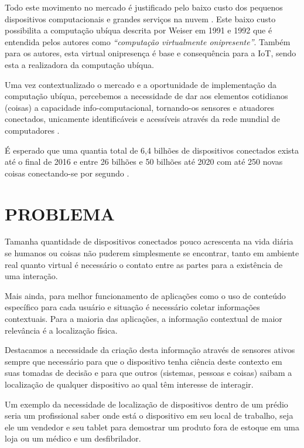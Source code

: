 \documentclass[
	12pt,				%
	openright,			%
	oneside,			%
	a4paper,			%
	chapter=TITLE,		%
	english,			%
	french,				%
	spanish,			%
	brazil				%
	]{abntex2}
\begin{document}
{Todo este movimento no mercado é justificado pelo baixo custo dos pequenos
dispositivos computacionais \cite{RpiZeroLaunch} \cite{Esp8266.net} e grandes
serviços na nuvem \cite{Kaufmann2015} \cite{Amazon2016}. Este baixo custo
possibilita a computação ubíqua descrita por Weiser em 1991 e 1992
\cite{Weiser1999} que é entendida pelos autores como \textit{``computação
virtualmente onipresente''}. Também para os autores, esta virtual onipresença é
base e consequência para a IoT, sendo esta a realizadora da computação ubíqua.

Uma vez contextualizado o mercado e a oportunidade de implementação da
computação ubíqua, percebemos a necessidade de dar aos elementos cotidianos
(coisas) a capacidade info-computacional, tornando-os sensores e atuadores
conectados, unicamente identificáveis e acessíveis através da rede mundial
de computadores \cite{Lemos2013} \cite{Kranenburg2012}.

É esperado que uma quantia total de 6,4 bilhões de dispositivos conectados
exista até o final de 2016 \cite{GARTNER2015} e entre 26 bilhões
\cite{GARTNER2014} e 50 bilhões até 2020 com até 250 novas coisas conectando-se
por segundo \cite{CiscoBlog2013}.

\chapter{PROBLEMA}
\label{chap:PROBLEMA}

Tamanha quantidade de dispositivos conectados pouco acrescenta na vida diária se
humanos ou coisas não puderem simplesmente se encontrar, tanto em ambiente real
quanto virtual é necessário o contato entre as partes para a existência de uma
interação.

Mais ainda, para melhor funcionamento de aplicações como o uso de conteúdo
específico para cada usuário e situação é necessário coletar informações
contextuais. Para a maioria das aplicações, a informação contextual de maior
relevância é a localização física.

Destacamos a necessidade da criação desta informação através de sensores ativos
sempre que necessário para que o dispositivo tenha ciência deste contexto em
suas tomadas de decisão e para que outros (sistemas, pessoas e coisas) saibam a
localização de qualquer dispositivo ao qual têm interesse de interagir.

Um exemplo da necessidade de localização de dispositivos dentro de um prédio
seria um profissional saber onde está o dispositivo em seu local de trabalho,
seja ele um vendedor e seu tablet para demostrar um produto fora de estoque em
uma loja ou um médico e um desfibrilador.

}
\end{document}

